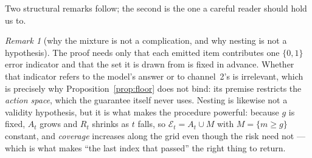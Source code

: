 \documentclass{article}
\theoremstyle{plain}
\theoremstyle{definition}
\theoremstyle{remark}
\newtheorem{remark}{Remark}
\newcommand{\emit}{\mathcal{E}}
\begin{document}
Two structural remarks follow; the second is the one a careful reader should hold us to.

\begin{remark}[why the mixture is not a complication, and why nesting is not a hypothesis]
The proof needs only that each emitted item contributes one $\{0,1\}$ error indicator and that
the set it is drawn from is fixed in advance. Whether that indicator refers to the model's
answer or to channel~2's is irrelevant, which is precisely why Proposition~\ref{prop:floor}
does not bind: its premise restricts the \emph{action space}, which the guarantee itself never
uses. Nesting is likewise not a validity hypothesis, but it is what makes the procedure
powerful: because $g$ is fixed, $A_t$ grows and $R_t$ shrinks as $t$ falls, so
$\emit_t=A_t\cup M$ with $M=\{m\ge g\}$ constant, and \emph{coverage} increases along the grid
even though the risk need not --- which is what makes ``the last index that passed'' the right
thing to return.
\end{remark}
\end{document}
